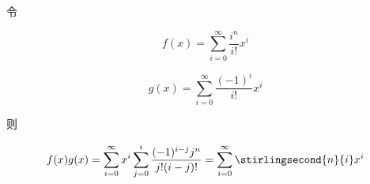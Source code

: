 令

\[
    f(x)=\sum_{i=0}^{\infty}\frac{i^n}{i!}x^i
\]

\[
    g(x)=\sum_{i=0}^{\infty}\frac{(-1)^i}{i!}x^i
\]

则

\[
    f(x)g(x)=\sum_{i=0}^{\infty}x^i\sum_{j=0}^i\frac{(-1)^{i-j}j^n}{j!(i-j)!}=\sum_{i=0}^{\infty}\stirlingsecond{n}{i}x^i
\]
